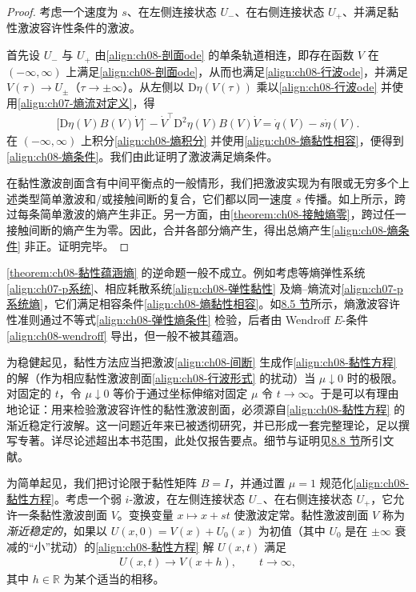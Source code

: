 \documentclass[../../main.tex]{subfiles}
\begin{document}
\begin{proof}
考虑一个速度为 $s$、在左侧连接状态 $U_-$、在右侧连接状态 $U_+$、并满足黏性激波容许性条件的激波。

首先设 $U_-$ 与 $U_+$ 由\eqref{align:ch08-剖面ode} 的单条轨道相连，即存在函数 $V$ 在 $(-\infty,\infty)$ 上满足\eqref{align:ch08-剖面ode}，从而也满足\eqref{align:ch08-行波ode}，并满足 $V(\tau)\to U_\pm$（$\tau\to\pm\infty$）。从左侧以 $\mathrm{D}\eta(V(\tau))$ 乘以\eqref{align:ch08-行波ode} 并使用\eqref{align:ch07-熵流对定义}，得
\begin{align}
\big[\mathrm{D}\eta(V)B(V)\dot V\big]^{\cdot}-\dot V^\top\mathrm{D}^2\eta(V)B(V)\dot V=\dot q(V)-s\dot\eta(V).
\label{align:ch08-熵积分}
\end{align}
在 $(-\infty,\infty)$ 上积分\eqref{align:ch08-熵积分} 并使用\eqref{align:ch08-熵黏性相容}，便得到\eqref{align:ch08-熵条件}。我们由此证明了激波满足熵条件。

在黏性激波剖面含有中间平衡点的一般情形，我们把激波实现为有限或无穷多个上述类型简单激波和/或接触间断的复合，它们都以同一速度 $s$ 传播。如上所示，跨过每条简单激波的熵产生非正。另一方面，由\cref{theorem:ch08-接触熵零}，跨过任一接触间断的熵产生为零。因此，合并各部分熵产生，得出总熵产生\eqref{align:ch08-熵条件} 非正。证明完毕。
\end{proof}

\cref{theorem:ch08-黏性蕴涵熵} 的逆命题一般不成立。例如考虑等熵弹性系统\eqref{align:ch07-p系统}、相应耗散系统\eqref{align:ch08-弹性黏性} 及熵--熵流对\eqref{align:ch07-p系统熵}，它们满足相容条件\eqref{align:ch08-熵黏性相容}。如\hyperref[section:ch08-熵激波容许性准则]{8.5 节}所示，熵激波容许性准则通过不等式\eqref{align:ch08-弹性熵条件} 检验，后者由 Wendroff $E$-条件\eqref{align:ch08-wendroff} 导出，但一般不被其蕴涵。

为稳健起见，黏性方法应当把激波\eqref{align:ch08-间断} 生成作\eqref{align:ch08-黏性方程} 的解（作为相应黏性激波剖面\eqref{align:ch08-行波形式} 的扰动）当 $\mu\downarrow0$ 时的极限。对固定的 $t$，令 $\mu\downarrow0$ 等价于通过坐标伸缩对固定 $\mu$ 令 $t\to\infty$。于是可以有理由地论证：用来检验激波容许性的黏性激波剖面，必须源自\eqref{align:ch08-黏性方程} 的渐近稳定行波解。这一问题近年来已被透彻研究，并已形成一套完整理论，足以撰写专著。详尽论述超出本书范围，此处仅报告要点。细节与证明见\hyperref[section:ch08-注记]{8.8 节}所引文献。

为简单起见，我们把讨论限于黏性矩阵 $B=I$，并通过置 $\mu=1$ 规范化\eqref{align:ch08-黏性方程}。考虑一个弱 $i$-激波，在左侧连接状态 $U_-$、在右侧连接状态 $U_+$，它允许一条黏性激波剖面 $V$。变换变量 $x\mapsto x+st$ 使激波定常。黏性激波剖面 $V$ 称为\emph{渐近稳定的}，如果以 $U(x,0)=V(x)+U_0(x)$ 为初值（其中 $U_0$ 是在 $\pm\infty$ 衰减的“小”扰动）的\eqref{align:ch08-黏性方程} 解 $U(x,t)$ 满足
\begin{align}
U(x,t)\to V(x+h),\qquad t\to\infty,
\label{align:ch08-渐近稳定}
\end{align}
其中 $h\in\mathbb R$ 为某个适当的相移。
\end{document}
